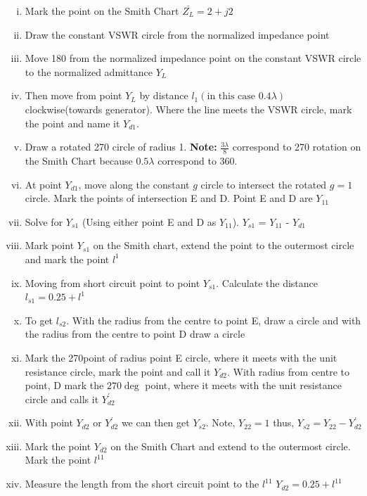 \begin{exmp}
\begin{enumerate}[(i)]
\item Mark the point on the Smith Chart $\bar{Z_{L}} = 2 + j2$  
\item Draw the constant VSWR circle from the normalized impedance point
\item Move 180\textdegree\; from the normalized impedance point on the constant VSWR circle to the normalized admittance $Y_{L}$
\item Then move from point $Y_{L}$ by distance $l_{1}(\text{in this case } 0.4\lambda)$ clockwise(towards generator). Where the line meets the VSWR circle, mark the point and name it $Y_{d1}$.           
\item Draw a rotated 270\textdegree\; circle of radius 1. \textbf{Note:} $\frac{3\lambda}{8}$ correspond to 270\textdegree\; rotation on the Smith Chart because $0.5\lambda$ correspond to 360\textdegree.
\item At point $Y_{d1}$, move along the constant $g$ circle to intersect the rotated $g = 1$ circle. Mark the points of intersection E and D.  Point E and D are $Y_{11}$                        
\item Solve for $Y_{s1}$ (Using either point E and D as $Y_{11}$). $Y_{s1}$ =  $Y_{11}$ -  $Y_{d1}$           
\item Mark point $Y_{s1}$ on the Smith chart, extend the point to the outermost circle and mark the point $l^{1}$ 
\item Moving from short circuit point to point $Y_{s1}$. Calculate the distance
$ l_{s1} = 0.25 + l^{1} $                                    
\item To get $l_{s2}$. With the radius from the centre to point E, draw a circle and with the radius from the centre to point D draw a circle
\item Mark the 270\textdegree point of radius point E circle, where it meets with the unit resistance circle, mark the point and call it $Y_{d2}$. With radius from centre to point, D mark the $270\deg$ point, where it meets with the unit resistance circle and calls it $Y_{d2}^{'}$ 
\item With point $Y_{d2}$ or $Y_{d2}^{'}$ we can then get $Y_{s2}$. Note, $Y_{22}=1$ thus, $Y_{s2}=Y_{22}-Y_{d2}^{'}$
\item Mark the point $Y_{d2}$ on the Smith Chart and extend to the outermost circle. Mark the point $l^{11}$
\item Measure the length from the short circuit point to the $l^{11}$ $Y_{d2} = 0.25 + l^{11}$
\end{enumerate}
\end{exmp}

